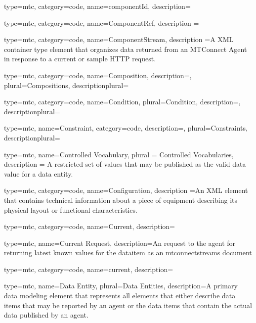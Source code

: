 {
  type=mtc,
  category=code,
  name={componentId},
  description={}
}

{
  type=mtc,
  category=code,
  name={ComponentRef},
  description ={}
 }

{
  type=mtc,
  category=code,
  name={ComponentStream},
  description ={A XML container type element that organizes data returned from an MTConnect Agent in response to a current or sample HTTP request.}
 }

{
  type=mtc,
  category=code,
  name={Composition},
  description={},
  plural={Compositions},
  descriptionplural={}
}

{
  type=mtc,
  category=code,
  name={Condition},
  plural={Condition},
  description={},
  descriptionplural={}
}

{
  type=mtc,
  name={Constraint},
  category=code,
  description={},
  plural={Constraints},
  descriptionplural={}
}

{
  type=mtc,
  name={Controlled Vocabulary},
  plural = {Controlled Vocabularies},
  description = {A restricted set of values that may be published as the \gls{valid data value} for a \gls{data entity}.}
}

{
  type=mtc,
  category=code,
  name={Configuration},
  description ={An XML element that contains technical information about a piece of equipment describing its physical layout or functional characteristics.}
 }

{
  type=mtc,
  category=code,
  name={Current},
  description={}
}

{
  type=mtc,
  name={Current Request},
  description={An  request to the \gls{agent} for returning latest known values for the \gls{dataitem} as an \glspl{mtconnectstream}  document}
}

{
  type=mtc,
  category=code,
  name={current},
  description={}
}

{
  type=mtc,
  name={Data Entity},
  plural={Data Entities},
  description={A primary data modeling element that represents all elements that either describe data items that may be reported by an \gls{agent} or the data items that contain the actual data published by an \gls{agent}.}
}

